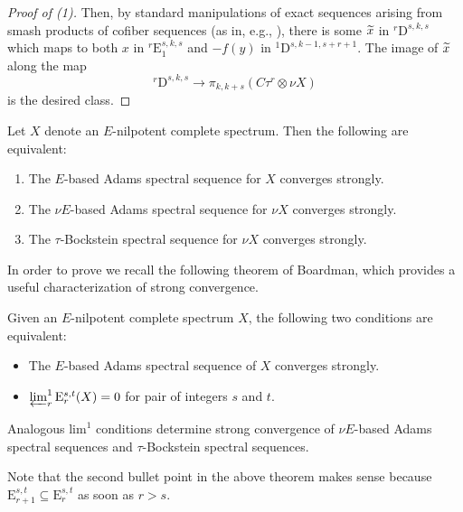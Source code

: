 \begin{proof}[Proof of (1)]
  Then, by standard manipulations of exact sequences arising from smash products of cofiber sequences (as in, e.g., \cite[Lemma 9.3.2]{AndrewsMiller}), there is some $\wt{x}$ in ${}^r\mathrm{D}^{s,k,s}$ which maps to both $x$ in ${}^r\mathrm{E}_1^{s,k,s}$ and $-f(y)$ in ${}^1\mathrm{D}^{s,k-1,s+r+1}$. The image of $\wt{x}$ along the map
  $$ {}^r\mathrm{D}^{s,k,s} \to \pi_{k,k+s}(C\tau^r \otimes \nu X) $$
  is the desired class.
\end{proof}

\begin{prop} \label{lemm:strong-etau-complete} \label{cor:strong-conv}
  Let $X$ denote an $E$-nilpotent complete spectrum.
  Then the following are equivalent:
  \begin{enumerate}
  \item The $E$-based Adams spectral sequence for $X$ converges strongly.
  \item The $\nu E$-based Adams spectral sequence for $\nu X$ converges strongly.
  \item The $\tau$-Bockstein spectral sequence for $\nu X$ converges strongly.
  \end{enumerate}
\end{prop}

In order to prove  we recall the following theorem of Boardman, which provides a useful characterization of strong convergence.

\begin{thm} \label{thm:strong-conv}
    Given an $E$-nilpotent complete spectrum $X$, the following two conditions are equivalent:
    \begin{itemize}
        \item The $E$-based Adams spectral sequence of $X$ converges strongly.
        \item $\varprojlim_{r}^{1} \mathrm{E}^{s,t}_r (X) = 0$ for pair of integers $s$ and $t$.
    \end{itemize}
		Analogous $\mathrm{lim}^1$ conditions determine strong convergence of $\nu E$-based Adams spectral sequences and $\tau$-Bockstein spectral sequences.
\end{thm}

Note that the second bullet point in the above theorem makes sense because $\mathrm{E}^{s,t} _{r+1} \subseteq \mathrm{E}^{s,t} _r$ as soon as $r>s$.


